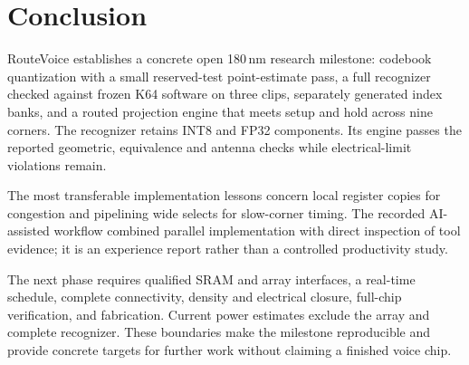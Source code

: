 \section{Conclusion}
\label{sec:conclusion}

RouteVoice establishes a concrete open 180\,nm research milestone: codebook quantization with a small reserved-test point-estimate pass, a full recognizer checked against frozen K64 software on three clips, separately generated index banks, and a routed projection engine that meets setup and hold across nine corners. The recognizer retains INT8 and FP32 components. Its engine passes the reported geometric, equivalence and antenna checks while electrical-limit violations remain.

The most transferable implementation lessons concern local register copies for congestion and pipelining wide selects for slow-corner timing. The recorded AI-assisted workflow combined parallel implementation with direct inspection of tool evidence; it is an experience report rather than a controlled productivity study.

The next phase requires qualified SRAM and array interfaces, a real-time schedule, complete connectivity, density and electrical closure, full-chip verification, and fabrication. Current power estimates exclude the array and complete recognizer. These boundaries make the milestone reproducible and provide concrete targets for further work without claiming a finished voice chip.
